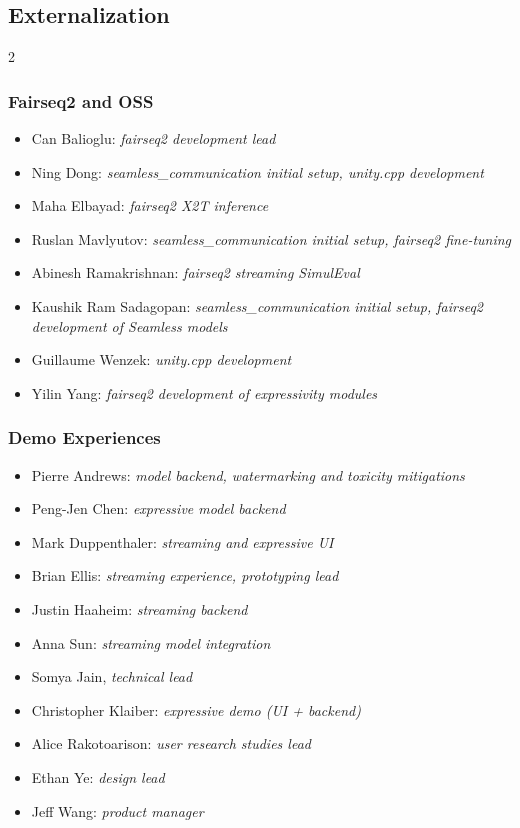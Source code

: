 \newpage

\subsection*{Externalization}

\begin{multicols}{2}

\subsubsection*{Fairseq2 and OSS}
\begin{itemize}[itemsep=0.00cm,parsep=0.0cm,left=0pt, label={}]
\item Can Balioglu: \textit{fairseq2 development lead}
\item Ning Dong: \textit{seamless\_communication initial setup, unity.cpp development}
\item Maha Elbayad: \textit{fairseq2 X2T inference}
\item Ruslan Mavlyutov: \textit{seamless\_communication initial setup, fairseq2 fine-tuning}
\item Abinesh Ramakrishnan: \textit{fairseq2 streaming SimulEval}
\item Kaushik Ram Sadagopan: \textit{seamless\_communication initial setup, fairseq2 development of Seamless models}
\item Guillaume Wenzek: \textit{unity.cpp development}
\item Yilin Yang: \textit{fairseq2 development of expressivity modules}
\end{itemize}
\columnbreak


\subsubsection*{Demo Experiences}
\begin{itemize}[itemsep=0.00cm,parsep=0.0cm,left=0pt, label={}]
\item Pierre Andrews: \textit{model backend, watermarking and toxicity mitigations}
\item Peng-Jen Chen: \textit{expressive model backend}
\item Mark Duppenthaler: \textit{streaming and expressive UI}
\item Brian Ellis: \textit{streaming experience, prototyping lead}
\item Justin Haaheim:  \textit{streaming backend}
\item Anna Sun: \textit{streaming model integration}
\item Somya Jain, \textit{technical lead}
\item Christopher Klaiber: \textit{expressive demo (UI + backend)}
\item Alice Rakotoarison: \textit{user research studies lead}
\item Ethan Ye:\textit{ design lead}
\item Jeff Wang: \textit{product manager }
\end{itemize}
\vspace*{\fill}
\end{multicols}

